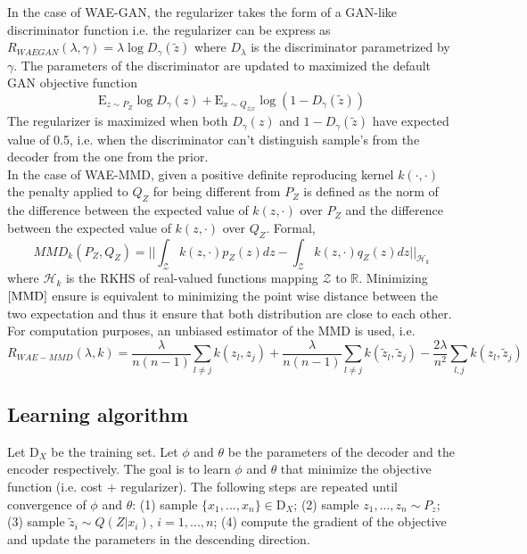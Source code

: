 \documentclass[12pt,english]{amsart}
\newcommand{\E}{\mathrm{E}}
\begin{document}
In the case of WAE-GAN, the regularizer takes the form of a GAN-like discriminator function i.e. the regularizer can be express as $R_{WAEGAN}(\lambda, \gamma) = \lambda\log D_{\gamma}(\tilde{z})$ where $D_{\lambda}$ is the discriminator parametrized by $\gamma$. The parameters of the discriminator are updated to maximized the default GAN objective function 
\begin{equation}
 \E_{z\sim P_Z}\log D_{\gamma}(z)+\E_{x\sim Q_{z|x}}\log(1-D_{\gamma}(\tilde{z}))
 \label{GAN}
\end{equation}
The regularizer is maximized when both $D_{\gamma}(z)$ and $1-D_{\gamma}(\tilde{z})$ have expected value of 0.5, i.e. when the discriminator can't distinguish sample's from the decoder from the one from the prior. \\

In the case of WAE-MMD, given a positive definite reproducing kernel $k(\cdot,\cdot)$ the penalty applied to $Q_Z$ for being different from $P_Z$ is defined as the norm of the difference between the expected value of $k(z,\cdot)$ over $P_Z$ and the difference between the expected value of $k(z,\cdot)$ over $Q_Z$. Formal, 
\begin{equation}
 MMD_k(P_Z, Q_Z) = ||\int_{\mathcal{Z}}k(z,\cdot)p_Z(z)dz-\int_{\mathcal{Z}}k(z,\cdot)q_Z(z)dz||_{\mathcal{H}_k}
 \label{MMD}
\end{equation}
where $\mathcal{H}_k$ is the RKHS of real-valued functions mapping $\mathcal{Z}$ to $\mathbb{R}$. Minimizing $\eqref{MMD}$ ensure is equivalent to minimizing the point wise distance between the two expectation and thus it ensure that both distribution are close to each other. For computation purposes, an unbiased estimator of the MMD is used, i.e. 
\begin{equation}
 R_{WAE-MMD}(\lambda, k) = 
 \frac{\lambda}{n(n-1)}\sum_{l\neq j}k(z_l,z_j) +
\frac{\lambda}{n(n-1)}\sum_{l\neq j}k(\tilde{z}_l,\tilde{z}_j) -
\frac{2\lambda}{n^2}\sum_{l, j}k(z_l,\tilde{z}_j)
 \end{equation}
 
\subsection{Learning algorithm}
Let $\mathrm{D}_X$ be the training set. Let $\phi$ and $\theta$ be the parameters of the decoder and the encoder respectively. The goal is to learn $\phi$ and $\theta$ that minimize the objective function (i.e. cost + regularizer). The following steps are repeated until convergence of $\phi$ and $\theta$: (1) sample $\{x_1,...,x_n\}\in\mathrm{D}_X$; (2) sample $z_1,...,z_n\sim P_z$; (3) sample $\tilde{z}_i\sim Q(Z|x_i)$, $i=1,...,n$; (4) compute the gradient of the objective and update the parameters in the descending direction.\\
\end{document}
